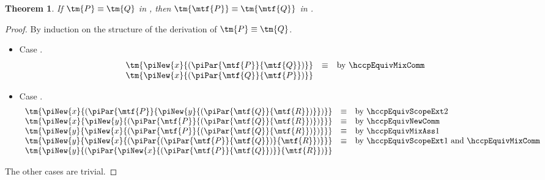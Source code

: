 \documentclass[submission,copyright,creativecommons]{eptcs}
\newtheorem{theorem}{Theorem}
\begin{document}
\begin{theorem}\label{thm:cp2hcp-equiv}
  If $\tm{P}\equiv\tm{Q}$ in \cp, then $\tm{\mtf{P}}\equiv\tm{\mtf{Q}}$ in \hcp.
\end{theorem}
\begin{proof}
  By induction on the structure of the derivation of $\tm{P}\equiv\tm{Q}$.
  \begin{itemize}
  \item
    Case \cpEquivCutComm.
    \[
      \begin{array}{lcl}
        \tm{\piNew{x}{(\piPar{\mtf{P}}{\mtf{Q}})}}
        & \equiv & \text{by \hccpEquivMixComm}
        \\
        \tm{\piNew{x}{(\piPar{\mtf{Q}}{\mtf{P}})}}
      \end{array}
    \]
  \item
    Case .
    \[
      \begin{array}{lcl}
        \tm{\piNew{x}{(\piPar{\mtf{P}}{\piNew{y}{(\piPar{\mtf{Q}}{\mtf{R}})}})}}
        & \equiv & \text{by \hccpEquivScopeExt2}
        \\
        \tm{\piNew{x}{\piNew{y}{(\piPar{\mtf{P}}{(\piPar{\mtf{Q}}{\mtf{R}})})}}}
        & \equiv & \text{by \hccpEquivNewComm}
        \\
        \tm{\piNew{y}{\piNew{x}{(\piPar{\mtf{P}}{(\piPar{\mtf{Q}}{\mtf{R}})})}}}
        & \equiv & \text{by \hccpEquivMixAss1}
        \\
        \tm{\piNew{y}{\piNew{x}{(\piPar{(\piPar{\mtf{P}}{\mtf{Q}})}{\mtf{R}})}}}
        & \equiv & \text{by \hccpEquivScopeExt1 and \hccpEquivMixComm}
        \\
        \tm{\piNew{y}{(\piPar{\piNew{x}{(\piPar{\mtf{P}}{\mtf{Q}})}}{\mtf{R}})}}
      \end{array}
    \]
  \end{itemize}
  The other cases are trivial.
\end{proof}
\end{document}
